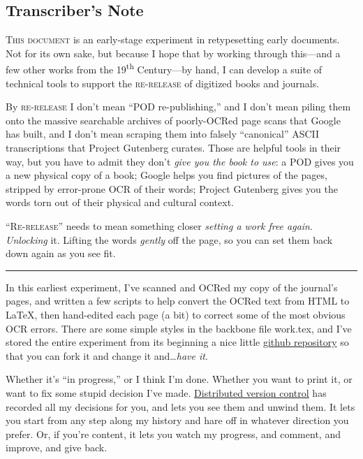 \subsection*{Transcriber's Note}
\lettrine[lines=3]{T}{his document} is an early-stage experiment in retypesetting early documents. Not for its own sake, but because I hope that by working through this---and a few other works from the 19\textsuperscript{th} Century---by hand, I can develop a suite of technical tools to support the \textsc{re-release} of digitized books and journals.

By \textsc{re-release} I don't mean ``POD re-publishing,'' and I don't mean piling them onto the massive searchable archives of poorly-OCRed page scans that Google has built, and I don't mean scraping them into falsely ``canonical'' ASCII transcriptions that Project Gutenberg curates. Those are helpful tools in their way, but you have to admit they don't \emph{give you the book to use}: a POD gives  you a new physical copy of a book; Google helps you find pictures of the pages, stripped by error-prone OCR of their words; Project Gutenberg gives you the words torn out of their physical and cultural context.

\textsc{``Re-release''} needs to mean something closer \emph{setting a work free again}. \emph{Unlocking} it. Lifting the words \emph{gently}  off the page, so you can set them back down again as you see fit.

\fancybreak{\ding{167}}

In this earliest experiment, I've scanned and OCRed my copy of the journal's pages, and written a few scripts to help convert the OCRed text from HTML to \LaTeX, then hand-edited each page (a bit) to correct some of the most obvious OCR errors. There are some simple styles in the backbone file \textsf{work.tex}, and I've stored the entire experiment from its beginning a nice little \href{http://github.com/Vaguery/collegeJournalOfMedicalScienceSeptember1857}{github repository} so that you can fork it and change it and\ldots \emph{have it}.

Whether it's ``in progress,'' or I think I'm done. Whether you want to print it, or want to fix some stupid decision I've made. \href{http://git-scm.com/}{Distributed version control} has recorded all my decisions for you, and lets you see them and unwind them. It lets you start from any step along my history and hare off in whatever direction you prefer. Or, if you're content, it lets you watch my progress, and comment, and improve, and give back.

